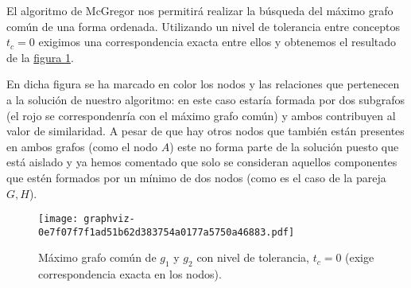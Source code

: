 \documentclass[a4paper,12pt,spanish]{book}
\begin{document}
El algoritmo de McGregor nos permitirá realizar la búsqueda del máximo grafo común
de una forma ordenada. Utilizando un nivel de tolerancia entre conceptos \(t_c=0\)
exigimos una correspondencia exacta entre ellos y obtenemos el resultado de la
\hyperref[4.model/ii.modelo:fig-model-example-mcs1]{figura  \ref*{4.model/ii.modelo:fig-model-example-mcs1}}.

En dicha figura se ha marcado en color los nodos y las relaciones que pertenecen a
la solución de nuestro algoritmo: en este caso estaría formada por dos subgrafos
(el rojo se correspondenría con el máximo grafo común) y ambos contribuyen al
valor de similaridad. A pesar de que hay otros nodos que también están presentes
en ambos grafos (como el nodo \(A\)) este no forma parte de la solución puesto
que está aislado y ya hemos comentado que solo se consideran aquellos componentes que
estén formados por un mínimo de dos nodos (como es el caso de la pareja \(G, H\)).
\begin{figure}[htbp]
\centering
\capstart

\texttt{[image: graphviz-0e7f07f7f1ad51b62d383754a0177a5750a46883.pdf]}
\caption{Máximo grafo común de \(g_1\) y \(g_2\) con nivel de tolerancia, \(t_c=0\) (exige correspondencia exacta en los nodos).}\label{4.model/ii.modelo:fig-model-example-mcs1}\end{figure}
\end{document}
